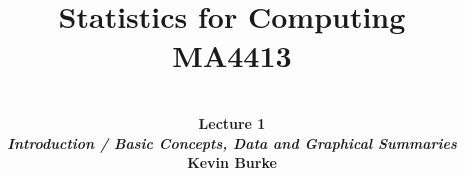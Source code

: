 \documentclass[compress]{beamer}        %
\title{{\huge Statistics for Computing\\[0.1cm]MA4413}}
\author[Kevin Burke]{{\bf\\[0.5cm]{\huge Lecture 1}\\[0.2cm]\emph{Introduction / Basic Concepts, Data and Graphical Summaries}\\[1.4cm]Kevin Burke}\\[0.3cm]\tcb{kevin.burke@ul.ie}}
\institute[University of Limerick, Maths \& Stats Dept]{}
\date{}
\makeatletter
\newcommand{\tcb}{\textcolor{beamer@blendedblue}}
\makeatother
\begin{document}
\begin{frame}[t]
\titlepage
\end{frame}

%
%
%
\end{document}

